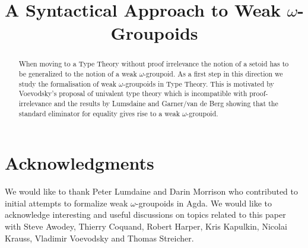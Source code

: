 \documentclass[conference, a4paper]{IEEEtran}
\begin{document}
\title{A Syntactical Approach to Weak $\omega$-Groupoids}

\author{
\and
{}
}

\maketitle


\begin{abstract}
  When moving to a Type Theory without proof irrelevance the notion of
  a setoid has to be generalized to the notion of a weak
  $\omega$-groupoid. As a first step in this direction we study the
  formalisation of weak $\omega$-groupoids in Type Theory. This is
  motivated by Voevodsky's proposal of univalent type theory which is
  incompatible with proof-irrelevance and the results by Lumsdaine and
  Garner/van de Berg showing that the standard eliminator for equality
  gives rise to a weak $\omega$-groupoid.
\end{abstract}
\IEEEpeerreviewmaketitle













%



  

\section*{Acknowledgments}

We would like to thank Peter Lumdaine and Darin Morrison who 
contributed to initial attempts to formalize weak $\omega$-groupoids
in Agda. We would like to acknowledge interesting and useful
discussions on topics related to this paper with Steve Awodey, Thierry Coquand, Robert Harper,
Kris Kapulkin, Nicolai Krauss, Vladimir Voevodsky and Thomas Streicher.




%

%
\end{document}
